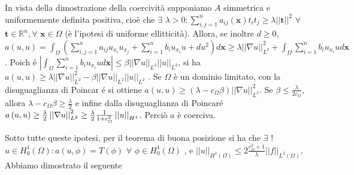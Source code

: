 \documentclass{article}
\begin{document}
In vista della dimostrazione della coercivit\`{a} supponiamo $A$ simmetrica e uniformemente definita positiva, cio\`{e} che $\exists $ $\lambda
>0:\sum_{i,j=1}^{n}a_{ij}\left( \mathbf{x}\right) t_{i}t_{j}\geq \lambda
\left\vert \left\vert \mathbf{t}\right\vert \right\vert ^{2}$ $\forall $ $%
\mathbf{t}\in 
\mathbb{R}
^{n},\forall $ $\mathbf{x}\in \Omega $ (\`{e} l'ipotesi di uniforme
ellitticit\`{a}). Allora, se inoltre $d\geq 0$, $a\left( u,u\right)
=\int_{\Omega }\left(
\sum_{i,j=1}^{n}a_{ij}u_{x_{i}}u_{x_{j}}+%
\sum_{i=1}^{n}b_{i}u_{x_{i}}u+du^{2}\right) d\mathbf{x}\geq \lambda
\left\vert \left\vert \nabla u\right\vert \right\vert
_{L^{2}}^{2}+\int_{\Omega }\sum_{i=1}^{n}b_{i}u_{x_{i}}ud\mathbf{x}$. Poich%
\'{e} $\left\vert \int_{\Omega }\sum_{i=1}^{n}b_{i}u_{x_{i}}ud\mathbf{x}%
\right\vert \leq \beta \left\vert \left\vert \nabla u\right\vert \right\vert
_{L^{2}}\left\vert \left\vert u\right\vert \right\vert _{L^{2}}$, si ha $%
a\left( u,u\right) \geq \lambda \left\vert \left\vert \nabla u\right\vert
\right\vert _{L^{2}}^{2}-\beta \left\vert \left\vert \nabla u\right\vert
\right\vert _{L^{2}}\left\vert \left\vert u\right\vert \right\vert _{L^{2}}$%
. Se $\Omega $ \`{e} un dominio limitato, con la disuguaglianza di Poincar%
\'{e} si ottiene $a\left( u,u\right) \geq \left( \lambda -c_{\Omega }\beta
\right) \left\vert \left\vert \nabla u\right\vert \right\vert _{L^{2}}^{2}$.
Se $\beta \leq \frac{\lambda }{2c_{\Omega }}$, allora $\lambda -c_{\Omega
}\beta \geq \frac{\lambda }{2}$ e infine dalla disuguaglianza di Poincar\'{e}
$a\left( u,u\right) \geq \frac{\lambda }{2}\left\vert \left\vert \nabla
u\right\vert \right\vert _{L^{2}}^{2}\geq \frac{\lambda }{2}\frac{1}{%
1+c_{\Omega }^{2}}\left\vert \left\vert u\right\vert \right\vert _{H^{1}}$.
Perci\`{o} $a$ \`{e} coerciva.

Sotto tutte queste ipotesi, per il teorema di buona posizione si ha che $%
\exists $ $!$ $u\in H_{0}^{1}\left( \Omega \right) :a\left( u,\phi \right)
=T\left( \phi \right) $ $\forall $ $\phi \in H_{0}^{1}\left( \Omega \right) $%
, e $\left\vert \left\vert u\right\vert \right\vert _{H^{1}\left( \Omega
\right) }\leq 2\frac{c_{\Omega }^{2}+1}{\lambda }\left\vert \left\vert
f\right\vert \right\vert _{L^{2}\left( \Omega \right) }$. Abbiamo dimostrato
il seguente
\end{document}
